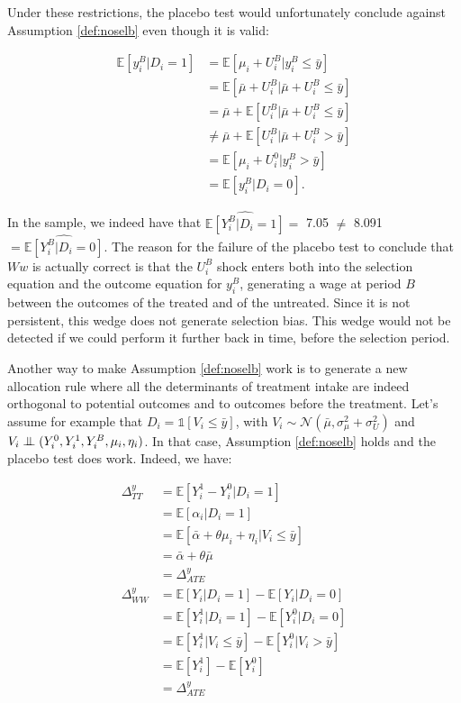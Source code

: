 \documentclass[]{book}
\newcommand{\uns}[1]{\mathds{1}[ #1 ]}
\newcommand{\esp}[1]{\mathbb{E}[ #1 ]}
\newcommand\Ind{\protect\mathpalette{\protect\independenT}{\perp}}
\def\independenT#1#2{\mathrel{\setbox0\hbox{$#1#2$}\copy0\kern-\wd0\mkern4mu\box0}}
\theoremstyle{definition}
\theoremstyle{definition}
\theoremstyle{definition}
\theoremstyle{remark}
\begin{document}
Under these restrictions, the placebo test would unfortunately conclude against Assumption \ref{def:noselb} even though it is valid:

\begin{align*}
\esp{y_i^B|D_i=1} & = \esp{\mu_i+ U_i^B|y_i^B\leq\bar{y}}\\
                  & = \esp{\bar{\mu}+U_i^B|\bar{\mu}+U_i^B\leq\bar{y}}\\
                  & = \bar{\mu}  + \esp{U_i^B|\bar{\mu}+U_i^B\leq\bar{y}}\\
                  & \neq \bar{\mu}  + \esp{U_i^B|\bar{\mu}+U_i^B>\bar{y}}\\
                  & = \esp{\mu_i+U_i^0|y_i^B>\bar{y}}\\
                  & = \esp{y_i^B|D_i=0}.                  
\end{align*}

In the sample, we indeed have that \(\hat{\esp{Y_i^B|D_i=1}}=\) 7.05 \(\neq\) 8.091 \(=\hat{\esp{Y_i^B|D_i=0}}\).
The reason for the failure of the placebo test to conclude that \(Ww\) is actually correct is that the \(U_i^B\) shock enters both into the selection equation and the outcome equation for \(y_i^B\), generating a wage at period \(B\) between the outcomes of the treated and of the untreated.
Since it is not persistent, this wedge does not generate selection bias.
This wedge would not be detected if we could perform it further back in time, before the selection period.

Another way to make Assumption \ref{def:noselb} work is to generate a new allocation rule where all the determinants of treatment intake are indeed orthogonal to potential outcomes and to outcomes before the treatment.
Let's assume for example that \(D_i=\uns{V_i\leq\bar{y}}\), with \(V_i\sim\mathcal{N}(\bar{\mu},\sigma^2_{\mu}+\sigma^2_{U})\) and \(V_i\Ind(Y_i^0,Y_i^1,Y_i^B,\mu_i,\eta_i)\).
In that case, Assumption \ref{def:noselb} holds and the placebo test does work.
Indeed, we have:

\begin{align*}
\Delta^y_{TT} & = \esp{Y_i^1-Y_i^0|D_i=1} \\
              & = \esp{\alpha_i|D_i=1} \\
              & = \esp{\bar{\alpha}+\theta\mu_i+\eta_i|V_i\leq\bar{y}}\\
              & = \bar{\alpha}+\theta\bar{\mu} \\
              & = \Delta^y_{ATE} \\
\Delta^y_{WW} & = \esp{Y_i|D_i=1} - \esp{Y_i|D_i=0} \\
              & = \esp{Y^1_i|D_i=1} - \esp{Y^0_i|D_i=0} \\
              & = \esp{Y^1_i|V_i\leq\bar{y}} - \esp{Y^0_i|V_i>\bar{y}} \\
              & = \esp{Y^1_i} - \esp{Y^0_i} \\
              & = \Delta^y_{ATE}
\end{align*}
\end{document}
